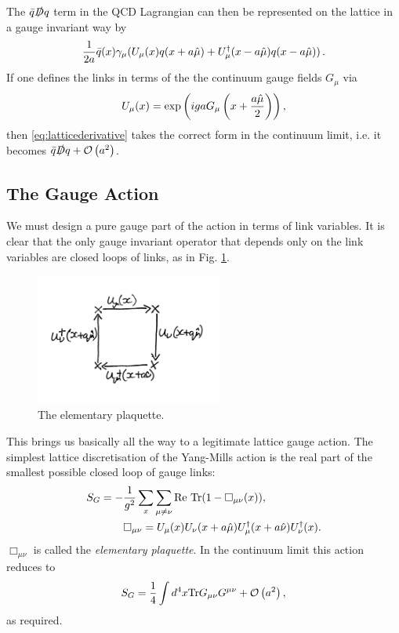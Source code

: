 The $\bar{q}\slashed{D}q$ term in the QCD Lagrangian can then be represented on the lattice in a gauge invariant way by
\begin{align}
  {1\over 2a}\bar{q}(x) \gamma_{\mu}(U_{\mu}(x)q(x+a\hat{\mu}) + U^{\dagger}_{\mu}(x-a\hat{\mu})q(x-a\hat{\mu}) )\,.
  \label{eq:latticederivative}
\end{align}
If one defines the links in terms of the the continuum gauge fields $G_{\mu}$ via
\begin{align}
  U_{\mu}(x) = \exp\left( iga G_{\mu}\left(x+{a\hat{\mu}\over2}\right) \right),
\end{align}
then \eqref{eq:latticederivative} takes the correct form in the continuum limit, i.e. it becomes $\bar{q}\slashed{D}q + \mathcal{O}\left( a^2 \right)$.

\subsection{The Gauge Action}

We must design a pure gauge part of the action in terms of link variables. It is clear that the only gauge invariant operator that depends only on the link variables are closed loops of links, as in Fig. \ref{fig:plaquette}.

\begin{figure}[htb!]
  \begin{center}
    \vspace{-10pt}
    \includegraphics[width=0.55\textwidth]{images/plaquette.jpg}
    \vspace{-15pt}
    \caption{The elementary plaquette. \label{fig:plaquette}}
  \end{center}
\end{figure}

This brings us basically all the way to a legitimate lattice gauge action. The simplest lattice discretisation of the Yang-Mills action is the real part of the smallest possible closed loop of gauge links:
\begin{align}
  S_G = - &{1\over g^2} \sum_x \sum_{\mu\neq \nu} \text{Re Tr} (1-\Box_{\mu\nu}(x)), \\
  &\Box_{\mu\nu} = U_{\mu}(x)U_{\nu}(x+a\hat{\mu}) U^{\dagger}_{\mu}(x+a\hat{\nu}) U^{\dagger}_{\nu}(x).
  \label{eq:wilson_gauge_action}
\end{align}
$\Box_{\mu\nu}$ is called the {\it{elementary plaquette}}. In the continuum limit this action reduces to
\begin{align}
  S_G = {1\over 4} \int d^4x \text{Tr}G_{\mu\nu}G^{\mu\nu} + \mathcal{O}\left( a^2 \right),
\end{align}
as required.

